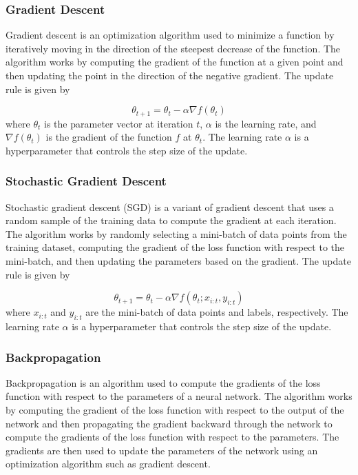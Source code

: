 \documentclass{article}
\begin{document}
\subsubsection{Gradient Descent}
Gradient descent is an optimization algorithm used to minimize a function by iteratively moving in the direction of the steepest decrease of the function. The algorithm works by computing the gradient of the function at a given point and then updating the point in the direction of the negative gradient. The update rule is given by

$$
    \theta_{t+1} = \theta_t - \alpha \nabla f(\theta_t)
$$
where $\theta_t$ is the parameter vector at iteration $t$, $\alpha$ is the learning rate, and $\nabla f(\theta_t)$ is the gradient of the function $f$ at $\theta_t$. The learning rate $\alpha$ is a hyperparameter that controls the step size of the update.

\subsubsection{Stochastic Gradient Descent}
Stochastic gradient descent (SGD) is a variant of gradient descent that uses a random sample of the training data to compute the gradient at each iteration. The algorithm works by randomly selecting a mini-batch of data points from the training dataset, computing the gradient of the loss function with respect to the mini-batch, and then updating the parameters based on the gradient. The update rule is given by

$$
    \theta_{t+1} = \theta_t - \alpha \nabla f(\theta_t; x_{i:t}, y_{i:t})
$$
where $x_{i:t}$ and $y_{i:t}$ are the mini-batch of data points and labels, respectively. The learning rate $\alpha$ is a hyperparameter that controls the step size of the update.


\subsubsection{Backpropagation}
Backpropagation is an algorithm used to compute the gradients of the loss function with respect to the parameters of a neural network. The algorithm works by computing the gradient of the loss function with respect to the output of the network and then propagating the gradient backward through the network to compute the gradients of the loss function with respect to the parameters. The gradients are then used to update the parameters of the network using an optimization algorithm such as gradient descent.
\end{document}
